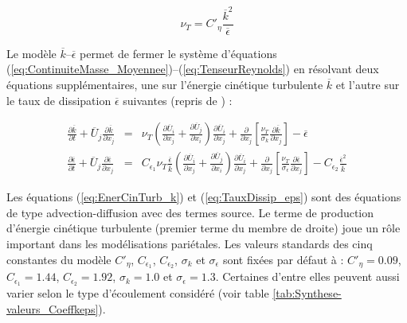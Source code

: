 \begin{equation}
\nu_{T}=C'_{\eta}\frac{\overline{k}^{2}}{\overline{\epsilon}}\label{eq:nu_T_RANS}
\end{equation}


Le mod\`ele $\overline{k}$--$\overline{\epsilon}$ permet de fermer
le syst\`eme d'\'equations (\ref{eq:ContinuiteMasse_Moyennee})--(\ref{eq:TenseurReynolds})
en r\'esolvant deux \'equations suppl\'ementaires, une sur l'\'energie cin\'etique
turbulente $\overline{k}$ et l'autre sur le taux de dissipation $\overline{\epsilon}$
suivantes \cite[p. 469]{Book_Chassaing} (repris de \cite[Eq. (2.2-1 et 2.2-2)]{Launder-Spalding_NumCompTurbFlow1974})
:

\begin{subequations}

\begin{eqnarray}
\frac{\partial\overline{k}}{\partial t}+\overline{U}_{j}\frac{\partial\overline{k}}{\partial x_{j}} & = & \nu_{T}\left(\frac{\partial\overline{U}_{i}}{\partial x_{j}}+\frac{\partial\overline{U}_{j}}{\partial x_{i}}\right)\frac{\partial\overline{U}_{i}}{\partial x_{j}}+\frac{\partial}{\partial x_{j}}\left[\frac{\nu_{T}}{\sigma_{k}}\frac{\partial\overline{k}}{\partial x_{j}}\right]-\overline{\epsilon}\label{eq:EnerCinTurb_k}\\
\frac{\partial\overline{\epsilon}}{\partial t}+\overline{U}_{j}\frac{\partial\overline{\epsilon}}{\partial x_{j}} & = & C_{\epsilon_{1}}\nu_{T}\frac{\overline{\epsilon}}{\overline{k}}\left(\frac{\partial\overline{U}_{i}}{\partial x_{j}}+\frac{\partial\overline{U}_{j}}{\partial x_{i}}\right)\frac{\partial\overline{U}_{i}}{\partial x_{j}}+\frac{\partial}{\partial x_{j}}\left[\frac{\nu_{T}}{\sigma_{\epsilon}}\frac{\partial\overline{\epsilon}}{\partial x_{j}}\right]-C_{\epsilon_{2}}\frac{\overline{\epsilon}^{2}}{\overline{k}}\label{eq:TauxDissip_eps}
\end{eqnarray}


\end{subequations}

Les \'equations (\ref{eq:EnerCinTurb_k}) et (\ref{eq:TauxDissip_eps})
sont des \'equations de type advection-diffusion avec des termes source.
Le terme de production d\textquoteright \'energie cin\'etique turbulente
(premier terme du membre de droite) joue un r\^ole important dans les
mod\'elisations pari\'etales. Les valeurs standards des cinq constantes
du mod\`ele $C'_{\eta}$, $C_{\epsilon_{1}}$, $C_{\epsilon_{2}}$,
$\sigma_{k}$ et $\sigma_{\epsilon}$ sont fix\'ees par d\'efaut \`a : $C'_{\eta}=0.09$,
$C_{\epsilon_{1}}=1.44$, $C_{\epsilon_{2}}=1.92$, $\sigma_{k}=1.0$
et $\sigma_{\epsilon}=1.3$. Certaines d'entre elles peuvent aussi
varier selon le type d'\'ecoulement consid\'er\'e (voir table \ref{tab:Synthese-valeurs_Coeffkeps}).


